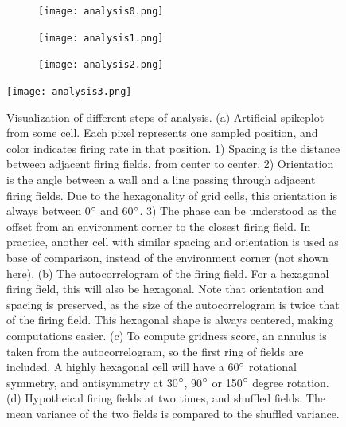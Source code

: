 \documentclass{article}
\begin{document}
    \begin{figure}[H]
        \centering
        \begin{minipage}[t]{\linewidth}
            \begin{subfigure}{0.32\linewidth}
                \subcaption{}
                \texttt{[image: analysis0.png]}
            \end{subfigure}
            \begin{subfigure}{0.32\linewidth}
                \subcaption{}
                \texttt{[image: analysis1.png]}
            \end{subfigure}
            \begin{subfigure}{0.32\linewidth}
                \subcaption{}
                \texttt{[image: analysis2.png]}
            \end{subfigure}
        \end{minipage}
        \begin{minipage}[t]{0.38\linewidth}
                \subcaption{}
                \texttt{[image: analysis3.png]}
        \end{minipage}
        \hspace{0.01\linewidth}
        \begin{minipage}[t]{0.59\linewidth}
            \caption{Visualization of different steps of analysis. (a) Artificial spikeplot from some cell. Each pixel represents one sampled position, and color indicates firing rate in that position. 1) Spacing is the distance between adjacent firing fields, from center to center. 2) Orientation is the angle between a wall and a line passing through adjacent firing fields. Due to the hexagonality of grid cells, this orientation is always between 0\(\degree\) and 60\(\degree\). 3) The phase can be understood as the offset from an environment corner to the closest firing field. In practice, another cell with similar spacing and orientation is used as base of comparison, instead of the environment corner (not shown here). (b) The autocorrelogram of the firing field. For a hexagonal firing field, this will also be hexagonal. Note that orientation and spacing is preserved, as the size of the autocorrelogram is twice that of the firing field. This hexagonal shape is always centered, making computations easier. (c) To compute gridness score, an annulus is taken from the autocorrelogram, so the first ring of fields are included. A highly hexagonal cell will have a 60\(\degree\) rotational symmetry, and antisymmetry at 30\(\degree\), 90\(\degree\) or 150\(\degree\) degree rotation. (d) Hypotheical firing fields at two times, and shuffled fields. The mean variance of the two fields is compared to the shuffled variance.}
            \label{analysis_plot}
        \end{minipage}
    \end{figure}
    
\end{document}
